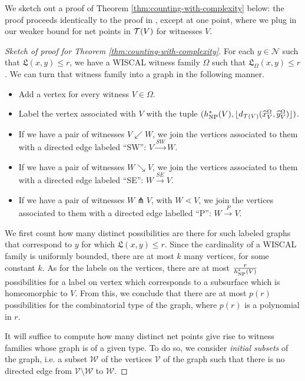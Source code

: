 \documentclass[12pt, reqno]{amsart}
\begin{document}
We sketch out a proof of Theorem \ref{thm:counting-with-complexity} below: the proof proceeds identically to the proof in \textcite{dowdall2023lattice}, except at one point, where we plug in our weaker bound for net points in $\mathcal{T}(V)$ for witnesses $V$.

\begin{proof}[Sketch of proof for Theorem \ref{thm:counting-with-complexity}]
  For each $y \in \mathcal{N}$ such that $\mathfrak{L}(x,y) \leq r$, we have a WISCAL witness family $\Omega$ such that $\mathfrak{L}_{\Omega}(x,y) \leq r$.
  We can turn that witness family into a graph in the following manner.
  \begin{itemize}
  \item Add a vertex for every witness $V \in \Omega$.
  \item Label the vertex associated with $V$ with the tuple $(h_{\mathrm{NP}}^{\ast}(V), \lfloor d_{\mathcal{T}(V)}(\widehat{x}_{V}^{\Omega}, \widehat{y}_{V}^{\Omega}) \rfloor)$.
  \item If we have a pair of witnesses $V \swarrow W$, we join the vertices associated to them with a directed edge labeled ``SW'': $V \xrightarrow{SW} W$.
  \item If we have a pair of witnesses $W \searrow V$, we join the vertices associated to them with a directed edge labeled ``SE'': $W \xrightarrow{SE} V$.
  \item If we have a pair of witnesses $W \pitchfork V$, with $W \lessdot V$, we join the vertices associated to them with a directed edge labelled ``P'': $W \xrightarrow{P} V$.
  \end{itemize}

  We first count how many distinct possibilities are there for such labeled graphs that correspond to $y$ for which $\mathfrak{L}(x,y) \leq r$.
  Since the cardinality of a WISCAL family is uniformly bounded, there are at most $k$ many vertices, for some constant $k$.
  As for the labels on the vertices, there are at most $\frac{r}{h_{\mathrm{NP}}^{\ast}(V)}$ possibilities for a label on vertex which corresponds to a subsurface which is homeomorphic to $V$.
  From this, we conclude that there are at most $p(r)$ possibilities for the combinatorial type of the graph, where $p(r)$ is a polynomial in $r$.

  It will suffice to compute how many distinct net points give rise to witness families whose graph is of a given type.
  To do so, we consider \emph{initial subsets} of the graph, i.e. a subset $\mathcal{W}$ of the vertices $\mathcal{V}$ of the graph such that there is no directed edge from $\mathcal{V} \setminus \mathcal{W}$ to $\mathcal{W}$.


\end{proof}
\end{document}
